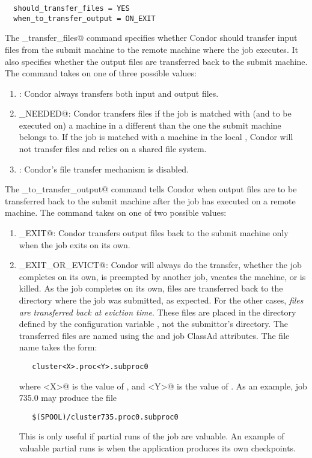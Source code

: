 \begin{verbatim}
  should_transfer_files = YES
  when_to_transfer_output = ON_EXIT
\end{verbatim}

The \verb@should_transfer_files@ command specifies
whether Condor should
transfer input files from the submit machine to the remote machine
where the job executes.
It also specifies whether the output files are transferred 
back to the submit machine.
The command takes on one of three possible values:
\begin{enumerate}

\item \verb@YES@: Condor always transfers both input and output files.

\item \verb@IF_NEEDED@: Condor transfers files if the job is
matched with (and to be executed on) a machine in a
different  than the
one the submit machine belongs to.
If the job is matched with a machine in the local ,
Condor will not transfer files and relies
on a shared file system.

\item \verb@NO@: Condor's file transfer mechanism is disabled. 

\end{enumerate}

The \verb@when_to_transfer_output@ command tells Condor when output
files are to be transferred back to the submit machine after the job
has executed on a remote machine.
The command takes on one of two possible values:

\begin{enumerate}
\item \verb@ON_EXIT@: Condor transfers output files back to the submit
machine only when the job exits on its own.

\item \verb@ON_EXIT_OR_EVICT@:
Condor will always do the transfer,
whether the job completes on its own, is preempted by another job, 
vacates the machine, or is killed.
As the job completes on its own, files are transferred back
to the directory where the job was submitted, as expected.
For the other cases, \emph{files are transferred back at eviction time}.
These files are placed in
the directory defined by the configuration
variable , not the submittor's directory. 
The transferred files are named using the
 and  job ClassAd attributes. 
The file name takes the form:
\begin{verbatim}
   cluster<X>.proc<Y>.subproc0
\end{verbatim}
where \verb@<X>@ is the value of , and 
\verb@<Y>@ is the value of . 
As an example, job 735.0 may produce the file
\begin{verbatim}
   $(SPOOL)/cluster735.proc0.subproc0
\end{verbatim}

This is only useful if partial runs of the job are valuable.
An example of valuable partial runs is when the application
produces its own checkpoints.
\end{enumerate}

